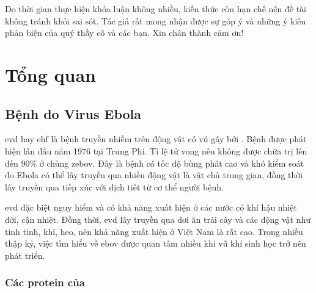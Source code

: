 \documentclass[12pt,a4paper,reqno, oneside]{book}
\begin{document}
	Do thời gian thực hiện khóa luận không nhiều, kiến thức còn hạn chế nên đề tài không tránh khỏi sai sót. Tác giả rất mong nhận được sự góp ý và những ý kiến phản biện của quý thầy cô và các bạn.
	\textrm{Xin chân thành cảm ơn!}
 
 
 
 
\newpage
\pagestyle{fancy}
\setcounter{page}{1}
\setcounter{chapter}{0}
\chapter{Tổng quan}

\section{Bệnh do Virus Ebola}

	\gls{evd} hay \gls{ehf} là bệnh truyền nhiễm trên động vật có vú gây bởi . Bệnh được phát hiện lần đầu năm 1976 tại Trung Phi\cite{Feldmann2003}. Tỉ lệ tử vong nếu không được chữa trị lên đến 90\% ở chủng \gls{zebov}. Đây là bệnh có tốc độ bùng phát cao và khó kiểm soát do Ebola có thể lây truyền qua nhiều động vật là vật chủ trung gian, đồng thời lây truyền qua tiếp xúc với dịch tiết từ cơ thể người bệnh\cite{Colebunders2000}.
	
	\gls{evd} đặc biệt nguy hiểm và có khả năng xuất hiện ở các nước có khí hậu nhiệt đới, cận nhiệt\cite{Ansari2014}. Đồng thời, \gls{evd} lây truyền qua dơi ăn trái cây và các động vật như tinh tinh, khỉ, heo\cite{Kuhn2010}, nên khả năng xuất hiện ở Việt Nam là rất cao. Trong nhiều thập kỷ, việc tìm hiểu về \gls{ebov} được quan tâm nhiều khi vũ khí sinh học trở nên phát triển\cite{Feldmann2003, Lee2009}.
	
\subsection{Các protein của }
\end{document}
